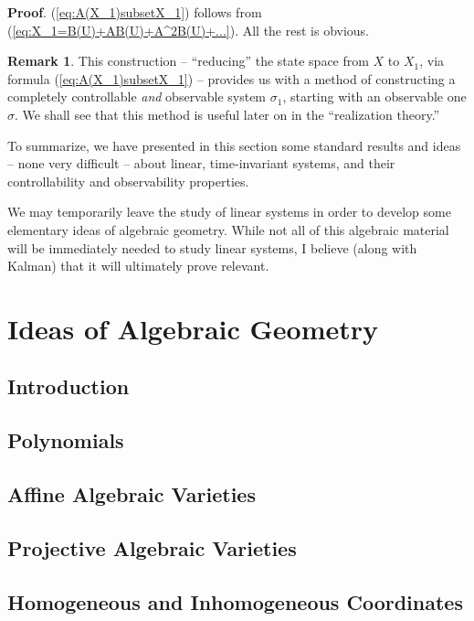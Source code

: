 \documentclass[12pt]{book}
\theoremstyle{plain}
\theoremstyle{definition}
\newtheorem*{remark}{Remark}
\begin{document}
\textbf{Proof}.
(\ref{eq:A(X_1)subsetX_1}) follows from (\ref{eq:X_1=B(U)+AB(U)+A^2B(U)+...}).
All the rest is obvious.

\begin{remark}
    This construction -- ``reducing'' the state space from $X$ to $X_1$, via formula (\ref{eq:A(X_1)subsetX_1}) -- provides us with a method of constructing a completely controllable \emph{and} observable system $\sigma_1$, starting with an observable one $\sigma$.
    We shall see that this method is useful later on in the ``realization theory.''
\end{remark}

To summarize, we have presented in this section some standard results and ideas -- none very difficult -- about linear, time-invariant systems, and their controllability and observability properties.

We may temporarily leave the study of linear systems in order to develop some elementary ideas of algebraic geometry.
While not all of this algebraic material will be immediately needed to study linear systems, I believe (along with Kalman) that it will ultimately prove relevant.

\chapter{Ideas of Algebraic Geometry}

\section{Introduction}

\section{Polynomials}

\section{Affine Algebraic Varieties}

\section{Projective Algebraic Varieties}

\section{Homogeneous and Inhomogeneous Coordinates}
\end{document}
